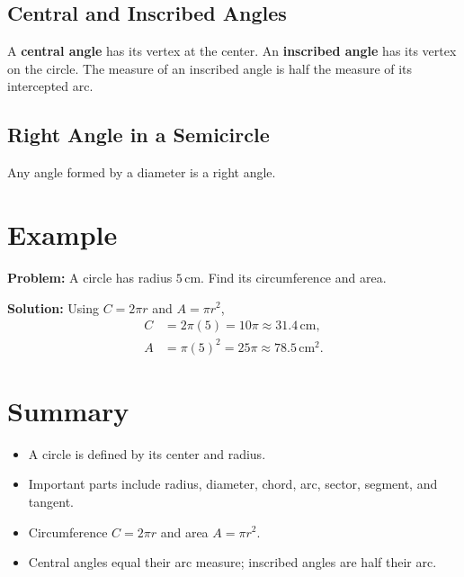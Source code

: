 \documentclass[12pt]{article}
\begin{document}
\subsection{Central and Inscribed Angles}
A \textbf{central angle} has its vertex at the center. An \textbf{inscribed angle} has its vertex on the circle. The measure of an inscribed angle is half the measure of its intercepted arc.

\begin{center}
\end{center}

\subsection{Right Angle in a Semicircle}
Any angle formed by a diameter is a right angle.

\begin{center}
\end{center}

\section{Example}
\textbf{Problem:} A circle has radius $5\,\text{cm}$. Find its circumference and area.

\textbf{Solution:} Using $C = 2\pi r$ and $A = \pi r^2$,
\begin{align*}
C &= 2\pi (5) = 10\pi \approx 31.4\,\text{cm},\\
A &= \pi (5)^2 = 25\pi \approx 78.5\,\text{cm}^2.
\end{align*}

\section*{Summary}
\begin{itemize}
  \item A circle is defined by its center and radius.
  \item Important parts include radius, diameter, chord, arc, sector, segment, and tangent.
  \item Circumference $C = 2\pi r$ and area $A = \pi r^2$.
  \item Central angles equal their arc measure; inscribed angles are half their arc.
\end{itemize}
\end{document}
